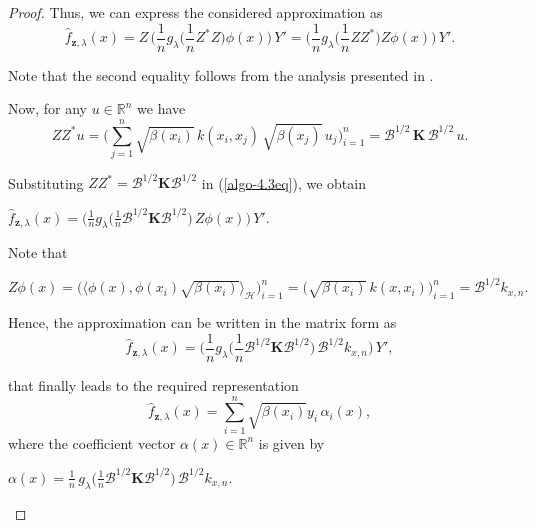 \documentclass[twoside,11pt]{article}
\begin{document}
\begin{proof}
\noindent
Thus, we can express the considered approximation  as
\begin{equation}\label{algo-4.3eq}
    \widehat{f}_{\mathbf{z},\lambda}(x) 
    = Z\,\!\Big(\frac{1}{n} g_\lambda\!\Big(\frac{1}{n}Z^*Z\Big)\phi(x)\Big)\, Y' = \Big(\frac{1}{n} g_\lambda\!\Big(\frac{1}{n}Z Z^*\Big) Z\phi(x)\Big)\, Y'. 
\end{equation}

\noindent
Note that the second equality follows from the analysis presented in \cite{meunier2024optimal}.

\noindent
Now, for any $u \in \mathbb{R}^n$ we have
\[
ZZ^* u
=
\Bigg(
\sum_{j=1}^n
\sqrt{\beta(x_i)}\, k(x_i,x_j)\, \sqrt{\beta(x_j)}\, u_j
\Bigg)_{i=1}^n
=
\mathcal B^{1/2}\, \mathbf K\, \mathcal B^{1/2}\, u .
\]


\noindent
Substituting  $ZZ^* =\mathcal B^{1/2} \mathbf{K}\mathcal B^{1/2}$ in  (\ref{algo-4.3eq}), we obtain
\begin{center}
    $\widehat{f}_{\mathbf{z},\lambda}(x) 
    = \Big( \frac{1}{n} g_\lambda\!\big( \frac{1}{n}\mathcal B^{1/2} \mathbf{K}\mathcal B^{1/2} \big)\, Z\phi(x) \Big)\, Y'.$
\end{center}


\noindent
Note that
\begin{center}
    $Z\phi(x) = \big( \langle \phi(x), \phi(x_i)\sqrt{\beta(x_i)} \rangle_{\mathcal H} \big)_{i=1}^n 
    = \big( \sqrt{\beta(x_i)}\, k(x,x_i) \big)_{i=1}^n =\mathcal B^{1/2} k_{x,n}.$
\end{center}

\vspace{0.4em}

\noindent
Hence, the approximation can be written in the matrix form as
\begin{equation}\label{predictor}
    \widehat{f}_{\mathbf{z},\lambda}(x) 
    = \Big( \frac{1}{n} g_\lambda\!\big( \frac{1}{n}\mathcal B^{1/2} \mathbf{K}\mathcal B^{1/2} \big)\,\mathcal B^{1/2} k_{x,n} \Big)\, Y',
\end{equation}

\noindent
that finally leads to the required representation
\[    \widehat{f}_{\mathbf{z},\lambda}(x) = \sum_{i=1}^n \sqrt{\beta(x_i)}  y_i \, \alpha_i(x),\]
where the coefficient vector $\alpha(x) \in \mathbb{R}^n$ is given by
\begin{center}
    $\alpha(x) = \frac{1}{n}\, g_\lambda\!\Big(\frac{1}{n}\mathcal B^{1/2} \mathbf{K}\mathcal B^{1/2}\Big)\,\mathcal B^{1/2} k_{x,n}.$
\end{center}
\end{proof}
\end{document}
